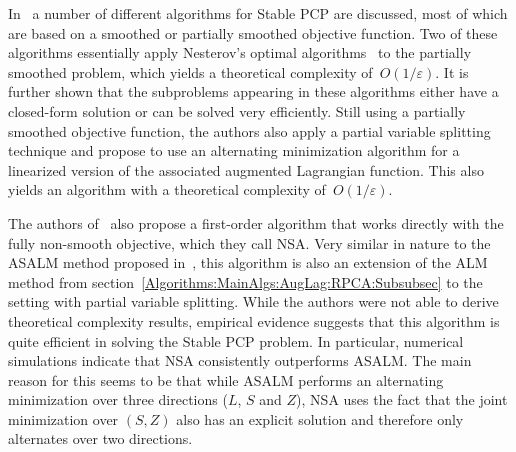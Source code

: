 \documentclass{../../common/projectreport}
\begin{document}
In~\cite{Aybat:2011vn} a number of different algorithms for Stable PCP are discussed, most of which are based on a smoothed or partially smoothed objective function. Two of these algorithms essentially apply Nesterov's optimal algorithms~\cite{Nesterov:2005fk} to the partially smoothed problem, which yields a theoretical complexity of~$O(1/\varepsilon)$. It is further shown that the subproblems appearing in these algorithms either have a closed-form solution or can be solved very efficiently. Still using a partially smoothed objective function, the authors also apply a partial variable splitting technique and propose to use an alternating minimization algorithm for a linearized version of the associated augmented Lagrangian function. This also yields an algorithm with a theoretical complexity of~$O(1/\varepsilon)$. 

The authors of~\cite{Aybat:2011vn} also propose a first-order algorithm that works directly with the fully non-smooth objective, which they call NSA. Very similar in nature to the ASALM method proposed in~\cite{Tao:2011vn}, this algorithm is also an extension of the ALM method from section~\ref{Algorithms:MainAlgs:AugLag:RPCA:Subsubsec} to the setting with partial variable splitting. While the authors were not able to derive theoretical complexity results, empirical evidence suggests that this algorithm is quite efficient in solving the Stable PCP problem. In particular, numerical simulations indicate that NSA consistently outperforms ASALM. The main reason for this seems to be that while ASALM performs an alternating minimization over three directions ($L$, $S$ and $Z$), NSA uses the fact that the joint minimization over $(S,Z)$ also has an explicit solution and therefore only alternates over two directions. 






\end{document}
